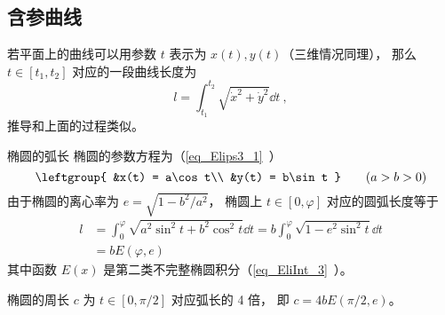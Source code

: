 \subsection{含参曲线}
若平面上的曲线可以用参数 $t$ 表示为 $x(t), y(t)$（三维情况同理）， 那么 $t \in [t_1, t_2]$ 对应的一段曲线长度为
\begin{equation}\label{eq_CurLen_2}
l = \int_{t_1}^{t_2} \sqrt{\dot x^2 + \dot y^2} \dd{t}~,
\end{equation}
推导和上面的过程类似。

\begin{example}{椭圆的弧长}\label{ex_CurLen_1}
椭圆的参数方程为（\autoref{eq_Elips3_1}~）
\begin{equation}
\leftgroup{
&x(t) = a\cos t\\
&y(t) = b\sin t
} \qquad
(a > b > 0)
\end{equation}
由于椭圆的离心率为 $e = \sqrt{1 - b^2/a^2}$， 椭圆上 $t \in [0, \varphi]$ 对应的圆弧长度等于
\begin{equation}
\begin{aligned}
l &= \int_0^{\varphi} \sqrt{a^2\sin^2 t + b^2 \cos^2 t} \dd{t}
= b\int_0^\varphi \sqrt{1 - e^2\sin^2 t} \dd{t}\\
&= b E(\varphi, e)
\end{aligned}
\end{equation}
其中函数 $E(x)$ 是第二类不完整椭圆积分（\autoref{eq_EliInt_3}~）。

椭圆的周长 $c$ 为 $t \in [0, \pi/2]$ 对应弧长的 4 倍， 即 $c = 4bE(\pi/2, e)$。
\end{example}

